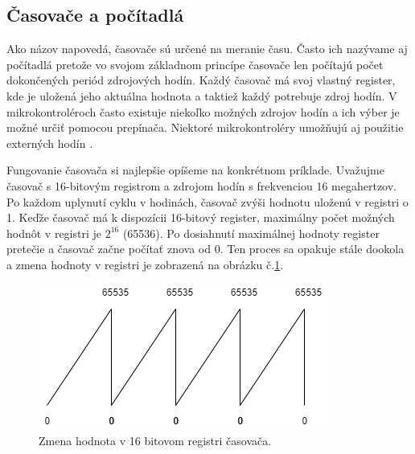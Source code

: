 \subsection{Časovače a počítadlá}
\noindent

Ako názov napovedá, časovače sú určené na meranie času. Často ich nazývame aj počítadlá
pretože vo svojom základnom princípe časovače len počítajú počet dokončených periód zdrojových hodín.
Každý časovač má svoj vlastný register, kde je uložená jeho aktuálna hodnota a taktiež každý potrebuje zdroj hodín. V mikrokontroléroch často existuje niekoľko možných zdrojov
hodín a ich výber je možné určiť pomocou prepínača. Niektoré mikrokontroléry umožňujú aj použitie
externých hodín \cite{IntroductionMicrocontrollerTimers}. \par
Fungovanie časovača si najlepšie opíšeme na konkrétnom príklade.
Uvažujme časovač s 16-bitovým registrom a zdrojom hodín s frekvenciou 16 megahertzov. Po každom uplynutí cyklu v hodinách, časovač
zvýši hodnotu uloženú v registri o 1. Keďže časovač má k dispozícii 16-bitový register, maximálny počet možných hodnôt v registri je $2^{16}$ (65536).
Po dosiahnutí maximálnej hodnoty register pretečie a časovač začne počítať znova od 0. Ten proces sa opakuje stále dookola a zmena hodnoty v
registri je zobrazená na obrázku č.\ref{figure:timer1}.

\begin{figure}[!h]
    \centering
    \includegraphics{img/timer.png}
    \caption{Zmena hodnota v 16 bitovom registri časovača.}
    \label{figure:timer1}
\end{figure}